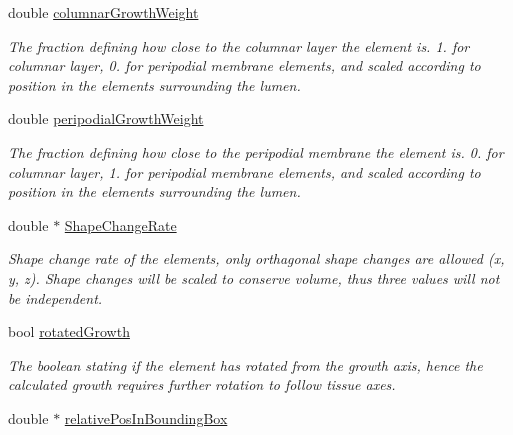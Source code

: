 \begin{DoxyCompactItemize}
\item 
\hypertarget{classShapeBase_a134d82ba500ef829b6aa3e3a83783c9a}{}double \hyperlink{classShapeBase_a134d82ba500ef829b6aa3e3a83783c9a}{columnar\+Growth\+Weight}\label{classShapeBase_a134d82ba500ef829b6aa3e3a83783c9a}

\begin{DoxyCompactList}\small\item\em The fraction defining how close to the columnar layer the element is. 1. for columnar layer, 0. for peripodial membrane elements, and scaled according to position in the elements surrounding the lumen. \end{DoxyCompactList}\item 
\hypertarget{classShapeBase_a3663f3220016756b1bd5a92477325ec2}{}double \hyperlink{classShapeBase_a3663f3220016756b1bd5a92477325ec2}{peripodial\+Growth\+Weight}\label{classShapeBase_a3663f3220016756b1bd5a92477325ec2}

\begin{DoxyCompactList}\small\item\em The fraction defining how close to the peripodial membrane the element is. 0. for columnar layer, 1. for peripodial membrane elements, and scaled according to position in the elements surrounding the lumen. \end{DoxyCompactList}\item 
\hypertarget{classShapeBase_a1c6db43b0794a15e4bc42b8ca994a785}{}double $\ast$ \hyperlink{classShapeBase_a1c6db43b0794a15e4bc42b8ca994a785}{Shape\+Change\+Rate}\label{classShapeBase_a1c6db43b0794a15e4bc42b8ca994a785}

\begin{DoxyCompactList}\small\item\em Shape change rate of the elements, only orthagonal shape changes are allowed (x, y, z). Shape changes will be scaled to conserve volume, thus three values will not be independent. \end{DoxyCompactList}\item 
\hypertarget{classShapeBase_aee6a2cd267d49404f5442a48c867860f}{}bool \hyperlink{classShapeBase_aee6a2cd267d49404f5442a48c867860f}{rotated\+Growth}\label{classShapeBase_aee6a2cd267d49404f5442a48c867860f}

\begin{DoxyCompactList}\small\item\em The boolean stating if the element has rotated from the growth axis, hence the calculated growth requires further rotation to follow tissue axes. \end{DoxyCompactList}\item 
\hypertarget{classShapeBase_a7a7826fb2ce3b2e666b65d99b00eadea}{}double $\ast$ \hyperlink{classShapeBase_a7a7826fb2ce3b2e666b65d99b00eadea}{relative\+Pos\+In\+Bounding\+Box}\label{classShapeBase_a7a7826fb2ce3b2e666b65d99b00eadea}


\end{DoxyCompactItemize}
